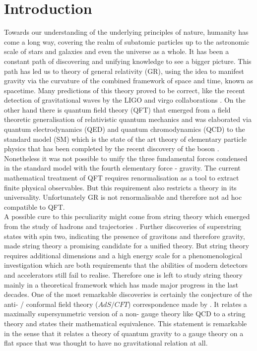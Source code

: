 \chapter{Introduction}
Towards our understanding of the underlying principles of nature, humanity has come a long way, covering the realm of subatomic particles up to the astronomic scale of stars and galaxies and even the universe as a whole. It has been a constant path of discovering and unifying knowledge to see a bigger picture. This path has led us to  theory of general relativity (GR), using the idea to manifest gravity via the curvature of the combined framework of space and time, known as spacetime. Many predictions of this theory proved to be correct, like the recent detection of gravitational waves by the LIGO and virgo collaborations \cite{Abbott:2016blz,Abbott:2016nmj}. On the other hand there is quantum field theory (QFT) that emerged from a field theoretic generalisation of relativistic quantum mechanics and was elaborated via quantum electrodynamics (QED) and quantum chromodynamics (QCD) to the standard model (SM) which is the state of the art theory of elementary particle physics that has been completed by the recent discovery of the  boson \cite{Chatrchyan:2012xdj,Aad:2012tfa}. Nonetheless it was not possible to unify the three fundamental forces condensed in the standard model with the fourth elementary force - gravity. The current mathematical treatment of QFT requires renormalisation as a tool to extract finite physical observables. But this requirement also restricts a theory in its universality. Unfortunately GR is not renormalisable and therefore not ad hoc compatible to QFT.\\
A possible cure to this peculiarity might come from string theory which emerged from the study of hadrons and  trajectories \cite{Veneziano:1968yb}. Further discoveries of superstring states with spin two, indicating the presence of gravitons and therefore gravity, made string theory a promising candidate for a unified theory. But string theory requires additional dimensions and a high energy scale for a phenomenological investigation which are both requirements that the abilities of modern detectors and accelerators still fail to realise. Therefore one is left to study string theory mainly in a theoretical framework which has made major progress in the last decades. One of the most remarkable discoveries is certainly the conjecture of the anti- / conformal field theory ($AdS/CFT$) correspondence made by  \cite{maldacena1}. It relates a maximally supersymmetric version of a non- gauge theory like QCD to a string theory and states their mathematical equivalence. This statement is remarkable in the sense that it relates a theory of quantum gravity to a gauge theory on a flat space that was thought to have no gravitational relation at all.\\

